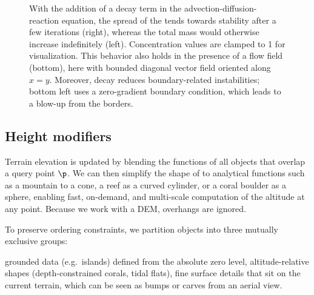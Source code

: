 \begin{figure}[H]
    \autofitcaptions[]{}
    \caption{With the addition of a decay term in the advection-diffusion-reaction equation, the spread of the  tends towards stability after a few iterations (right), whereas the total mass would otherwise increase indefinitely (left). Concentration values are clamped to 1 for visualization. This behavior also holds in the presence of a flow field (bottom), here with bounded diagonal vector field oriented along $x=y$. Moreover, decay reduces boundary-related instabilities; bottom left uses a zero-gradient boundary condition, which leads to a blow-up from the borders.}
    \label{fig:env-obj-stability-examples}
\end{figure}

\subsection{Height modifiers}

Terrain elevation is updated by blending the  functions of all objects that overlap a query point $\p$. We can then simplify the shape of  to analytical functions such as a mountain to a cone, a reef as a curved cylinder, or a coral boulder as a sphere, enabling fast, on-demand, and multi-scale computation of the altitude at any point. Because we work with a DEM, overhangs are ignored.

To preserve ordering constraints, we partition objects into three mutually exclusive groups:
\begin{Itemize}
    \Item{$\groundedHeight$} grounded data (e.g.\ islands) defined from the absolute zero level,
    \Item{$\altitudeHeight$} altitude-relative shapes (depth-constrained corals, tidal flats),
    \Item{$\surfaceHeight$} fine surface details that sit on the current terrain, which can be seen as bumps or carves from an aerial view.
\end{Itemize}

